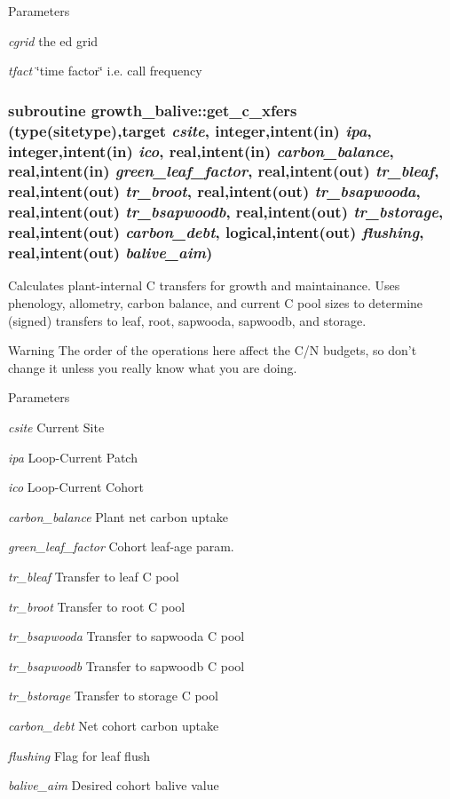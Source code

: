 \begin{DoxyParams}{Parameters}
\item[{\em cgrid}]the ed grid\item[{\em tfact}]\char`\"{}time factor\char`\"{} i.e. call frequency \end{DoxyParams}
\hypertarget{namespacegrowth__balive_a4a738e1e648a3932ae0beb2400c9bf78}{
\subsubsection[{get\_\-c\_\-xfers}]{\setlength{\rightskip}{0pt plus 5cm}subroutine growth\_\-balive::get\_\-c\_\-xfers (type({\bf sitetype}),target {\em csite}, \/  integer,intent(in) {\em ipa}, \/  integer,intent(in) {\em ico}, \/  real,intent(in) {\em carbon\_\-balance}, \/  real,intent(in) {\em green\_\-leaf\_\-factor}, \/  real,intent(out) {\em tr\_\-bleaf}, \/  real,intent(out) {\em tr\_\-broot}, \/  real,intent(out) {\em tr\_\-bsapwooda}, \/  real,intent(out) {\em tr\_\-bsapwoodb}, \/  real,intent(out) {\em tr\_\-bstorage}, \/  real,intent(out) {\em carbon\_\-debt}, \/  logical,intent(out) {\em flushing}, \/  real,intent(out) {\em balive\_\-aim})}}
\label{namespacegrowth__balive_a4a738e1e648a3932ae0beb2400c9bf78}


Calculates plant-\/internal C transfers for growth and maintainance. Uses phenology, allometry, carbon balance, and current C pool sizes to determine (signed) transfers to leaf, root, sapwooda, sapwoodb, and storage. \begin{DoxyWarning}{Warning}
The order of the operations here affect the C/N budgets, so don't change it unless you really know what you are doing. 
\end{DoxyWarning}

\begin{DoxyParams}{Parameters}
\item[{\em csite}]Current Site\item[{\em ipa}]Loop-\/Current Patch\item[{\em ico}]Loop-\/Current Cohort\item[{\em carbon\_\-balance}]Plant net carbon uptake\item[{\em green\_\-leaf\_\-factor}]Cohort leaf-\/age param.\item[{\em tr\_\-bleaf}]Transfer to leaf C pool\item[{\em tr\_\-broot}]Transfer to root C pool\item[{\em tr\_\-bsapwooda}]Transfer to sapwooda C pool\item[{\em tr\_\-bsapwoodb}]Transfer to sapwoodb C pool\item[{\em tr\_\-bstorage}]Transfer to storage C pool\item[{\em carbon\_\-debt}]Net cohort carbon uptake\item[{\em flushing}]Flag for leaf flush\item[{\em balive\_\-aim}]Desired cohort balive value \end{DoxyParams}
